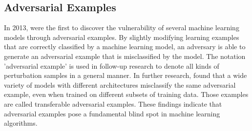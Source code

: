 \subsection{Adversarial Examples}
In 2013, \cite{szegedy2013intriguing}  were the first to discover the vulnerability of several machine learning models through adversarial examples.
By slightly modifying learning examples that are correctly classified by a machine learning model, an adversary is able to generate an adversarial example that is misclassified by the model.
The notation 'adversarial example' is used in follow-up research to denote all kinds of perturbation samples in a general manner. In further research, \cite{goodfellow2014explaining} found that a wide variety of models with different architectures misclassify the same adversarial example, even when trained on different subsets of training data. Those examples are called transferable adversarial examples. These findings indicate that adversarial examples pose a fundamental blind spot in machine learning algorithms.


